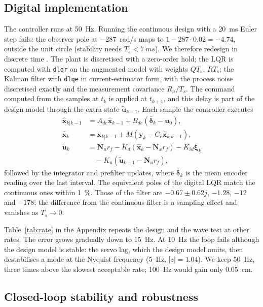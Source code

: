 \documentclass[conference]{IEEEtran}
\begin{document}
\subsection{Digital implementation}
\label{sec:dig}

The controller runs at \SI{50}{Hz}. Running the continuous design with a
\SI{20}{ms} Euler step fails: the observer pole at \SI{-287}{rad/s} maps to
$1-287\cdot0.02=-4.74$, outside the unit circle (stability needs
$T_s<\SI{7}{ms}$). We therefore redesign in discrete time \cite{franklin}. The
plant is discretised with a zero-order hold; the LQR is computed with
\texttt{dlqr} on the augmented model with weights $QT_s$, $RT_s$; the Kalman
filter with \texttt{dlqe} in current-estimator form, with the process noise
discretised exactly \cite{vanloan} and the measurement covariance
$R_n/T_s$. The command computed from the samples at $t_k$ is applied at
$t_{k+1}$, and this delay is part of the design model through the extra state
$\tilde{\bm u}_{k-1}$. Each sample the controller executes
\begin{align*}
\hat{\bm x}_{k|k-1}&=A_{de}\hat{\bm x}_{k-1}+B_{de}(\bar{\bm\delta}_k-\bm u_0),\\
\hat{\bm x}_k&=\hat{\bm x}_{k|k-1}+M(\bm y_k-C_e\hat{\bm x}_{k|k-1}),\\
\tilde{\bm u}_k&=\bm N_ur_f-K_d(\hat{\bm x}_k-\bm N_xr_f)-K_{id}\bm\xi_k\\
&\quad-K_u(\tilde{\bm u}_{k-1}-\bm N_ur_f),
\end{align*}
followed by the integrator and prefilter updates, where $\bar{\bm\delta}_k$ is
the mean encoder reading over the last interval. The equivalent poles of the
digital LQR match the continuous ones within \SI{1}{\percent}. Those of the
filter are $-0.67\pm0.62j$, $-1.28$, $-12$ and $-178$; the difference from the
continuous filter is a sampling effect and vanishes as $T_s\to0$.

Table~\ref{tab:rate} in the Appendix repeats the design and the wave test at other rates. The
error grows gradually down to \SI{15}{Hz}. At \SI{10}{Hz} the loop fails although
the design model is stable: the servo lag, which the design model omits, then
destabilises a mode at the Nyquist frequency (\SI{5}{Hz}, $|z|=1.04$). We keep
\SI{50}{Hz}, three times above the slowest acceptable rate; \SI{100}{Hz} would
gain only \SI{0.05}{cm}.
\subsection{Closed-loop stability and robustness}
\end{document}

